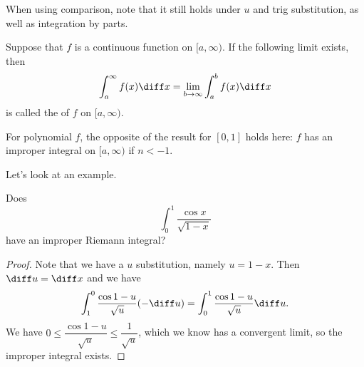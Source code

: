 \begin{remark*}
When using comparison, note that it still holds under $u$ and trig substitution, as well as integration by parts. 
\end{remark*}

\begin{definition}
Suppose that $f$ is a continuous function on $[a, \infty)$. If the following limit exists, then 
\[ \int_a^\infty f(x) \diff x = \lim_{b\to\infty} \int_a^b f(x) \diff x \] is called the  of $f$ on $[a,\infty)$. 
\end{definition}

For polynomial $f$, the opposite of the result for $[0,1]$ holds here: $f$ has an improper integral on $[a,\infty)$ if $n < -1$. 

Let's look at an example. 
\begin{example}
Does 
\[ \int_0^1 \dfrac{\cos{x}}{\sqrt{1-x}}\] have an improper Riemann integral?
\end{example}
\begin{proof}
Note that we have a $u$ substitution, namely $u = 1-x$. Then $\diff u = \diff x$ and we have 
\[ \int_1^0 \dfrac{\cos{1-u}}{\sqrt{u}} (-\diff u) = \int_0^1 \dfrac{\cos{1-u}}{\sqrt{u}} \diff u. \]
We have $0 \leq \dfrac{\cos{1-u}}{\sqrt{u}} \leq \dfrac{1}{\sqrt{u}}$, which we know has a convergent limit, so the improper integral exists. 
\end{proof}
